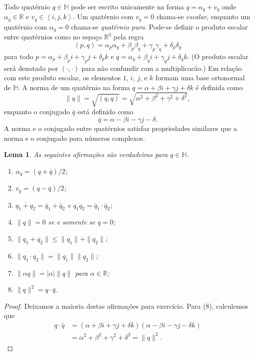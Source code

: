 \documentclass[12pt]{amsart}
\newcommand{\Ha}{\mathbb H}
\newcommand{\R}{\mathbb R}
\newtheorem{lemma}[theorem]{Lema}
\theoremstyle{definition}
\begin{document}
Todo quatérnio $q\in\Ha$ pode ser escrito unicamente na forma $q=\alpha_q+v_q$ onde $\alpha_q\in\R$ e 
$v_q\in\left<i,j,k\right>$. Um quatérnio com $v_q=0$ chama-se \emph{escalar}, enquanto um quatérnio com 
$\alpha_q=0$ chama-se \emph{quatérnio puro}. Pode-se definir o produto escalar entre quatérnios como no espaço
$\R^3$ pela regra
\[
    (p,q)=\alpha_p\alpha_q+\beta_p\beta_q+\gamma_p\gamma_q+\delta_p\delta_q
\]
para todo $p=\alpha_p+\beta_pi+\gamma_pj+\delta_pk$ e $q=\alpha_q+\beta_qi+\gamma_qj+\delta_qk$.
(O produto escalar será denotado por $(\cdot,\cdot)$ para não confundir com a multiplicacão.)
Em relação com este produto escalar, os elementos $1$, $i$, $j$, e $k$ formam uma base ortonormal de 
$\Ha$.
A norma de um quatérnio na forma $q=\alpha+\beta i+\gamma j+\delta k$ é definida como 
\[
    \|q\|=\sqrt{(q,q)}=\sqrt{\alpha^2+\beta^2+\gamma^2+\delta^2},
\]
enquanto o conjugado $\bar q$ está definido como 
\[
    \bar q=\alpha-\beta i-\gamma j-\delta.
\]
A norma e o conjugado entre quatérnios satisfaz propriedades similares que a norma e o 
conjugado para números complexos.

\begin{lemma}
    As seguintes afirmações são verdadeiras para $q\in\Ha$.
    \begin{enumerate}
        \item $\alpha_q=(q+\bar q)/2$; 
        \item $v_q=(q-\bar q)/2$;
        \item $\overline{q_1+q_2}=\bar q_1+\bar q_2$ e $\overline{q_1q_2}=\bar q_1\cdot \bar q_2$;
        \item $\|q\|=0$ se e somente se $q=0$;
        \item $\|q_1+q_2\|\leq \|q_1\|+ \|q_2\|$;
        \item  $\|q_1\cdot q_2\|= \|q_1\|\|q_2\|$;
        \item $\|\alpha q\|=|\alpha|\|q\|$ para $\alpha\in\R$;
        \item $\|q\|^2=q\cdot \bar q$.
    \end{enumerate}
\end{lemma}
\begin{proof}
    Deixamos a maioria destas afirmações para exercício. 
    Para (8), calculemos que 
    \begin{align*}
        q\cdot \bar q&=(\alpha+\beta i+\gamma j+\delta k)(\alpha-\beta i-\gamma j-\delta k)\\&= 
        \alpha^2+\beta^2+\gamma^2+\delta^2=\|q\|^2.
    \end{align*}
\end{proof}
\end{document}

